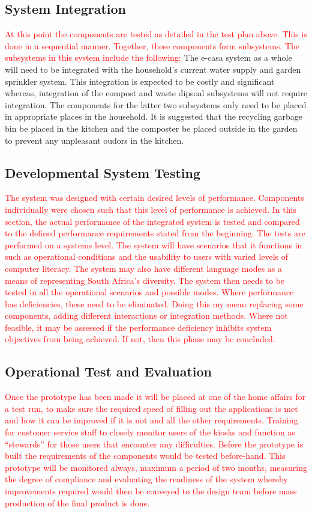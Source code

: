 \documentclass[a4paper,11pt,fleqn]{report}
\begin{document}
{\subsection{System Integration}
\textcolor{red}{At this point the components are tested as detailed in the test plan above. This is done in a sequential manner. Together, these components form subsystems. The subsystems in this system include the following:}
The \ac{e-casa} system as a whole will need to be integrated with the household's current water supply and garden sprinkler system. This integration is expected to be costly and significant whereas, integration of the compost and waste dipsoal subsystems will not require integration. The components for the latter two subsystems only need to be placed in appropriate places in the household. It is suggested that the recycling garbage bin be placed in the kitchen and the composter be placed outside in the garden to prevent any unpleasant oudors in the kitchen.

\subsection{Developmental System Testing}
\textcolor{red}{The system was designed with certain desired levels of performance. Components individually were chosen such that this level of performance is achieved. In this section, the actual performance of the integrated system is tested and compared to the defined performance requirements stated from the beginning. The tests are performed on a systems level. The system will have scenarios that it functions in such as operational conditions and the usability to users with varied levels of computer literacy. The system may also have different language modes as a means of representing South Africa’s diversity. The system then needs to be tested in all the operational scenarios and possible modes. Where performance has deficiencies, these need to be eliminated. Doing this my mean replacing some components, adding different interactions or integration methods. Where not feasible, it may be assessed if the performance deficiency inhibits system objectives from being achieved. If not, then this phase may be concluded.}

\subsection{Operational Test and Evaluation}
\textcolor{red}{Once the prototype has been made it will be placed at one of the home affairs for a test run, to make sure the required speed of filling out the applications is met and how it can be improved if it is not and all the other requirements. Training for customer service staff to closely monitor users of the kiosks and function as “stewards” for those users that encounter any difficulties. Before the prototype is built the requirements of the components would be tested before-hand. This prototype will be monitored always, maximum a period of two months, measuring the degree of compliance and evaluating the readiness of the system whereby improvements required would then be conveyed to the design team before mass production of the final product is done.}

}
\end{document}
